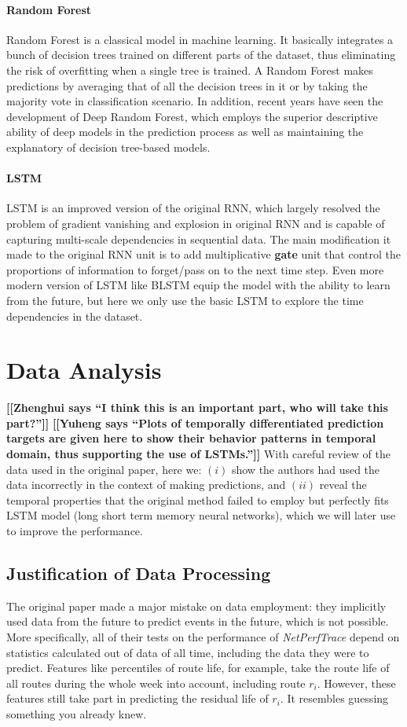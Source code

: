 \documentclass[sigconf]{acmart}
\newcommand{\heng}[1]{{\bf \color{cyan} [[Yuheng says ``#1'']]}}
\newcommand{\hui}[1]{{\bf \color{purple} [[Zhenghui says ``#1'']]}}
\begin{document}
	\paragraph{Random Forest} Random Forest is a classical model in machine learning. It basically integrates a bunch of decision trees trained on different parts of the dataset, thus eliminating the risk of overfitting when a single tree is trained. A Random Forest makes predictions by averaging that of all the decision trees in it or by taking the majority vote in classification scenario. In addition, recent years have seen the development of Deep Random Forest, which employs the superior descriptive ability of deep models in the prediction process as well as maintaining the explanatory of decision tree-based models.
	
	\paragraph{LSTM} LSTM is an improved version of the original RNN, which largely resolved the problem of gradient vanishing and explosion in original RNN and is capable of capturing multi-scale dependencies in sequential data. The main modification it made to the original RNN unit is to add multiplicative \textbf{gate} unit that control the proportions of information to forget/pass on to the next time step. Even more modern version of LSTM like BLSTM equip the model with the ability to learn from the future, but here we only use the basic LSTM to explore the time dependencies in the dataset.
	
	\section{Data Analysis}
	\label{sec:dataAna}
	\hui{I think this is an important part, who will take this part?}
	\heng{Plots of temporally differentiated prediction targets are given here to show their behavior patterns in temporal domain, thus supporting the use of LSTMs.}
	With careful review of the data used in the original paper, here we: $(i)$ show the authors had used the data incorrectly in the context of making predictions, and $(ii)$ reveal the temporal properties that the original method failed to employ but perfectly fits LSTM model (long short term memory neural networks), which we will later use to improve the performance.
	\subsection{Justification of Data Processing}
	The original paper \cite{oripaper} made a major mistake on data employment: they implicitly used data from the future to predict events in the future, which is not possible. More specifically, all of their tests on the performance of \textit{NetPerfTrace} depend on statistics calculated out of data of all time, including the data they were to predict. Features like percentiles of route life, for example, take the route life of all routes during the whole week into account, including route $r_i$. However, these features still take part in predicting the residual life of $r_i$. It resembles guessing something you already knew.
	
\end{document}
